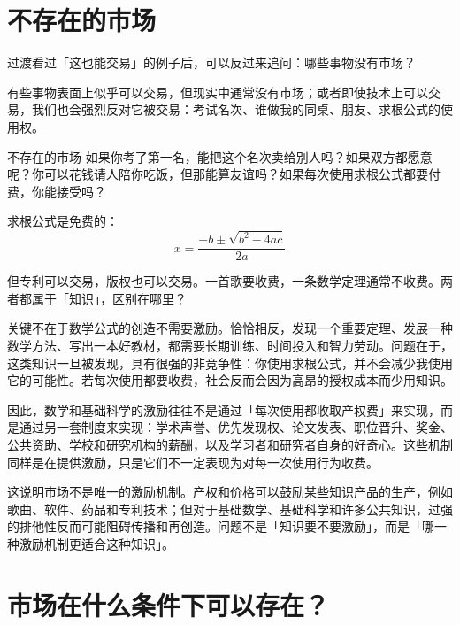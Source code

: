 \documentclass[10pt,a4paper]{ctexart}
\newcommand{\transitionnote}[1]{%
  \begin{conceptbox}{过渡}#1\end{conceptbox}%
}
\begin{document}
\section{不存在的市场}

\transitionnote{看过「这也能交易」的例子后，可以反过来追问：哪些事物没有市场？}

有些事物表面上似乎可以交易，但现实中通常没有市场；或者即使技术上可以交易，我们也会强烈反对它被交易：考试名次、谁做我的同桌、朋友、求根公式的使用权。

\begin{discussionbox}{不存在的市场}
如果你考了第一名，能把这个名次卖给别人吗？如果双方都愿意呢？你可以花钱请人陪你吃饭，但那能算友谊吗？如果每次使用求根公式都要付费，你能接受吗？
\end{discussionbox}

求根公式是免费的：
\[
x = \frac{-b \pm \sqrt{b^2 - 4ac}}{2a}
\]

但专利可以交易，版权也可以交易。一首歌要收费，一条数学定理通常不收费。两者都属于「知识」，区别在哪里？

关键不在于数学公式的创造不需要激励。恰恰相反，发现一个重要定理、发展一种数学方法、写出一本好教材，都需要长期训练、时间投入和智力劳动。问题在于，这类知识一旦被发现，具有很强的非竞争性：你使用求根公式，并不会减少我使用它的可能性。若每次使用都要收费，社会反而会因为高昂的授权成本而少用知识。

因此，数学和基础科学的激励往往不是通过「每次使用都收取产权费」来实现，而是通过另一套制度来实现：学术声誉、优先发现权、论文发表、职位晋升、奖金、公共资助、学校和研究机构的薪酬，以及学习者和研究者自身的好奇心。这些机制同样是在提供激励，只是它们不一定表现为对每一次使用行为收费。

这说明市场不是唯一的激励机制。产权和价格可以鼓励某些知识产品的生产，例如歌曲、软件、药品和专利技术；但对于基础数学、基础科学和许多公共知识，过强的排他性反而可能阻碍传播和再创造。问题不是「知识要不要激励」，而是「哪一种激励机制更适合这种知识」。

\section{市场在什么条件下可以存在？}

\end{document}
